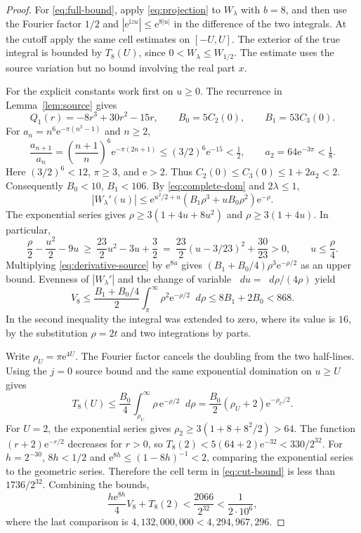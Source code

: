 \documentclass[11pt]{article}
\newcommand{\dd}{\mathop{}\!d}
\newcommand{\ee}{\mathrm e}
\newcommand{\ii}{\mathrm i}
\begin{document}
\begin{proof}
For \eqref{eq:full-bound}, apply \eqref{eq:projection}
to \(W_\lambda\) with \(b=8\), and then use the Fourier factor
\(1/2\) and \(|\ee^{\ii zu}|\le \ee^{8|u|}\) in the difference
of the two integrals. At the cutoff apply the same cell estimates
on \([-U,U]\). The exterior of the true integral is bounded by
\(T_8(U)\), since \(0<W_\lambda\le W_{1/2}\).
The estimate uses the source variation but no bound involving
the real part \(x\).

For the explicit constants work first on \(u\ge0\).
The recurrence in Lemma~\ref{lem:source} gives
\[
 Q_1(r)=-8r^3+30r^2-15r,\qquad
 B_0=5C_2(0),\qquad B_1=53C_3(0).
\]
For \(a_n=n^6\ee^{-\pi(n^2-1)}\) and \(n\ge2\),
\[
 \frac{a_{n+1}}{a_n}
 =\left(\frac{n+1}{n}\right)^6\ee^{-\pi(2n+1)}
 \le (3/2)^6\ee^{-15}<\tfrac12,\qquad
 a_2=64\ee^{-3\pi}<\tfrac18.
\]
Here \((3/2)^6<12\), \(\pi\ge3\), and \(\ee>2\).
Thus \(C_2(0)\le C_3(0)\le 1+2a_2<2\).
Consequently \(B_0<10\), \(B_1<106\). By
\eqref{eq:complete-dom} and \(2\lambda\le1\),
\begin{equation}\label{eq:derivative-source}
 |W_\lambda'(u)|\le
    \ee^{u^2/2+u}(B_1\rho^3+u B_0\rho^2)\ee^{-\rho}.
\end{equation}
The exponential series gives \(\rho\ge 3(1+4u+8u^2)\) and
\(\rho\ge 3(1+4u)\). In particular,
\[
 \frac{\rho}{2}-\frac{u^2}{2}-9u
 \ \ge\ \frac{23}{2}u^2-3u+\frac32
 \ =\ \frac{23}{2}(u-3/23)^2+\frac{30}{23}>0,\qquad
 u\le \frac{\rho}{4}.
\]
Multiplying \eqref{eq:derivative-source} by \(\ee^{8u}\)
gives \((B_1+B_0/4)\rho^3\ee^{-\rho/2}\) as an upper bound.
Evenness of \(|W_\lambda'|\) and the change of variable
\(\dd u=\dd\rho/(4\rho)\) yield
\[
 V_8\le \frac{B_1+B_0/4}{2}
             \int_\pi^\infty \rho^2\ee^{-\rho/2}\dd\rho
     \le 8B_1+2B_0<868.
\]
In the second inequality the integral was extended to zero,
where its value is \(16\), by the substitution \(\rho=2t\)
and two integrations by parts.

Write \(\rho_U=\pi\ee^{4U}\).
The Fourier factor cancels the doubling from the two half-lines.
Using the \(j=0\) source bound and the same exponential domination
on \(u\ge U\) gives
\begin{equation}\label{eq:tail}
 T_8(U)\le \frac{B_0}{4}\int_{\rho_U}^\infty
             \rho\,\ee^{-\rho/2}\dd\rho
          =\frac{B_0}{2}(\rho_U+2)\ee^{-\rho_U/2}.
\end{equation}
For \(U=2\), the exponential series gives
\(\rho_2\ge3(1+8+8^2/2)>64\). The function
\((r+2)\ee^{-r/2}\) decreases for \(r>0\), so
\(T_8(2)<5(64+2)\ee^{-32}<330/2^{32}\).
For \(h=2^{-30}\), \(8h<1/2\) and
\(\ee^{8h}\le(1-8h)^{-1}<2\), comparing the exponential series
to the geometric series. Therefore the cell term in
\eqref{eq:cut-bound} is less than \(1736/2^{32}\). Combining
the bounds,
\[
 \frac{h\ee^{8h}}4 V_8+T_8(2)
   <\frac{2066}{2^{32}}<\frac{1}{2\cdot10^6},
\]
where the last comparison is
\(4{,}132{,}000{,}000<4{,}294{,}967{,}296\).
\end{proof}
\end{document}
